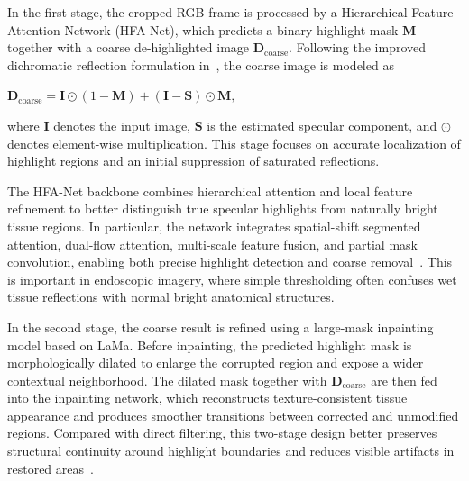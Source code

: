 In the first stage, the cropped RGB frame is processed by a Hierarchical Feature Attention Network (HFA-Net), which predicts a binary highlight mask $\mathbf{M}$ together with a coarse de-highlighted image $\mathbf{D}_{\text{coarse}}$. Following the improved dichromatic reflection formulation in~\cite{li2025twostagehighlight}, the coarse image is modeled as
\begin{center}
    $\displaystyle \mathbf{D}_{\text{coarse}} = \mathbf{I}\odot(1-\mathbf{M}) + (\mathbf{I}-\mathbf{S})\odot\mathbf{M},$
\end{center}
where $\mathbf{I}$ denotes the input image, $\mathbf{S}$ is the estimated specular component, and $\odot$ denotes element-wise multiplication. This stage focuses on accurate localization of highlight regions and an initial suppression of saturated reflections.

The HFA-Net backbone combines hierarchical attention and local feature refinement to better distinguish true specular highlights from naturally bright tissue regions. In particular, the network integrates spatial-shift segmented attention, dual-flow attention, multi-scale feature fusion, and partial mask convolution, enabling both precise highlight detection and coarse removal~\cite{li2025twostagehighlight}. This is important in endoscopic imagery, where simple thresholding often confuses wet tissue reflections with normal bright anatomical structures.

In the second stage, the coarse result is refined using a large-mask inpainting model based on LaMa. Before inpainting, the predicted highlight mask is morphologically dilated to enlarge the corrupted region and expose a wider contextual neighborhood. The dilated mask together with $\mathbf{D}_{\text{coarse}}$ are then fed into the inpainting network, which reconstructs texture-consistent tissue appearance and produces smoother transitions between corrected and unmodified regions. Compared with direct filtering, this two-stage design better preserves structural continuity around highlight boundaries and reduces visible artifacts in restored areas~\cite{li2025twostagehighlight}.

